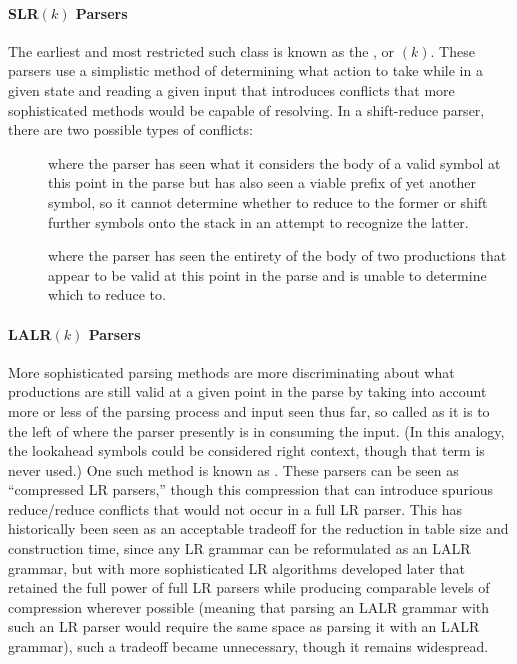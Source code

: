 \paragraph{SLR$(k)$ Parsers}
The earliest and most restricted such class is known as the , or $(k)$. These parsers use a simplistic method of determining what action to take while in a given state and reading a given input that introduces conflicts that more sophisticated methods would be capable of resolving. In a shift-reduce parser, there are two possible types of conflicts: 
\begin{description}
\item[] where the parser has seen what it considers the body of a valid symbol at this point in the parse but has also seen a viable prefix of yet another symbol, so it cannot determine whether to reduce to the former or shift further symbols onto the stack in an attempt to recognize the latter.
\item[] where the parser has seen the entirety of the body of two productions that appear to be valid at this point in the parse and is unable to determine which to reduce to.
\end{description}

\paragraph{LALR$(k)$ Parsers}
More sophisticated parsing methods are more discriminating about what productions are still valid at a given point in the parse by taking into account more or less of the parsing process and input seen thus far, so called  as it is to the left of where the parser presently is in consuming the input. (In this analogy, the lookahead symbols could be considered right context, though that term is never used.) One such method is known as . These parsers can be seen as ``compressed LR parsers,'' though this compression that can introduce spurious reduce/reduce conflicts that would not occur in a full LR parser. This has historically been seen as an acceptable tradeoff for the reduction in table size and construction time, since any LR grammar can be reformulated as an LALR grammar, but with more sophisticated LR algorithms developed later that retained the full power of full LR parsers while producing comparable levels of compression wherever possible (meaning that parsing an LALR grammar with such an LR parser would require the same space as parsing it with an LALR grammar), such a tradeoff became unnecessary, though it remains widespread. 

